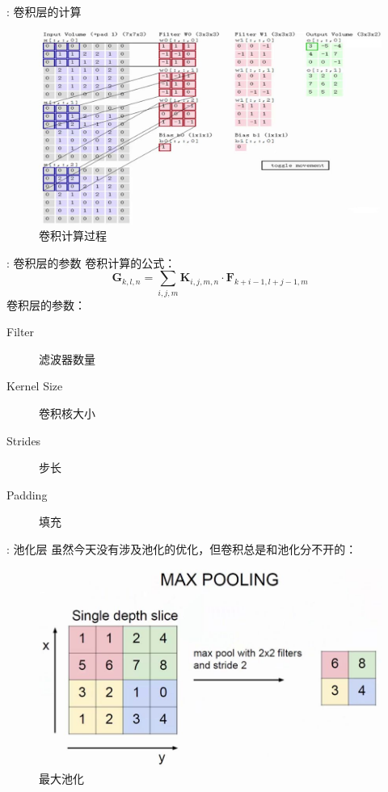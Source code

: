 \documentclass[UTF8, fontset=founder, aspectratio=43, 10pt, t]{ctexbeamer}
\begin{document}
\begin{frame}{\titleprefix: 卷积层的计算}
	\begin{figure}
		\centering
		\includegraphics[width=\linewidth]{Images/conv_1}
		\caption{卷积计算过程}
		\label{fig:conv1}
	\end{figure}
	
\end{frame}

\begin{frame}{\titleprefix: 卷积层的参数}
	卷积计算的公式：
	\[
	\mathbf{G}_{k, l, n}=\sum_{i, j, m} \mathbf{K}_{i, j, m, n} \cdot \mathbf{F}_{k+i-1, l+j-1, m}
	\]
	卷积层的参数：
	\begin{description}
		\item[Filter] 滤波器数量
		\item[Kernel Size] 卷积核大小
		\item[Strides] 步长
		\item[Padding] 填充
	\end{description}
	
\end{frame}

\begin{frame}{\titleprefix: 池化层}
	虽然今天没有涉及池化的优化，但卷积总是和池化分不开的：
	\begin{figure}
		\centering
		\includegraphics[width=0.7\linewidth]{Images/pool_1}
		\caption{最大池化}
		\label{fig:pool1}
	\end{figure}
\end{frame}
\end{document}
